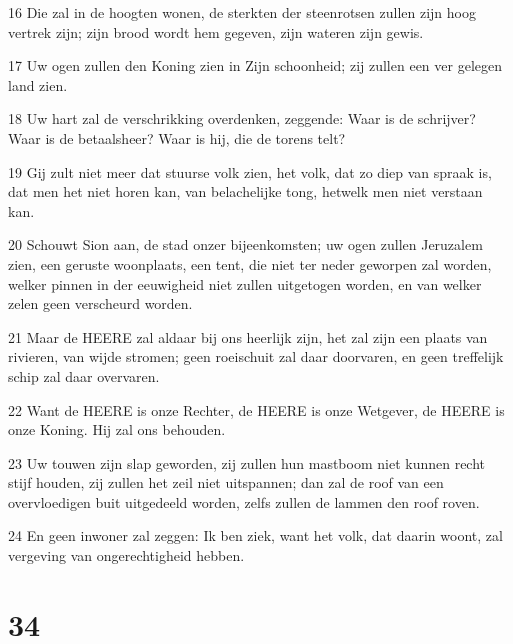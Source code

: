 \par 16 Die zal in de hoogten wonen, de sterkten der steenrotsen zullen zijn hoog vertrek zijn; zijn brood wordt hem gegeven, zijn wateren zijn gewis.
\par 17 Uw ogen zullen den Koning zien in Zijn schoonheid; zij zullen een ver gelegen land zien.
\par 18 Uw hart zal de verschrikking overdenken, zeggende: Waar is de schrijver? Waar is de betaalsheer? Waar is hij, die de torens telt?
\par 19 Gij zult niet meer dat stuurse volk zien, het volk, dat zo diep van spraak is, dat men het niet horen kan, van belachelijke tong, hetwelk men niet verstaan kan.
\par 20 Schouwt Sion aan, de stad onzer bijeenkomsten; uw ogen zullen Jeruzalem zien, een geruste woonplaats, een tent, die niet ter neder geworpen zal worden, welker pinnen in der eeuwigheid niet zullen uitgetogen worden, en van welker zelen geen verscheurd worden.
\par 21 Maar de HEERE zal aldaar bij ons heerlijk zijn, het zal zijn een plaats van rivieren, van wijde stromen; geen roeischuit zal daar doorvaren, en geen treffelijk schip zal daar overvaren.
\par 22 Want de HEERE is onze Rechter, de HEERE is onze Wetgever, de HEERE is onze Koning. Hij zal ons behouden.
\par 23 Uw touwen zijn slap geworden, zij zullen hun mastboom niet kunnen recht stijf houden, zij zullen het zeil niet uitspannen; dan zal de roof van een overvloedigen buit uitgedeeld worden, zelfs zullen de lammen den roof roven.
\par 24 En geen inwoner zal zeggen: Ik ben ziek, want het volk, dat daarin woont, zal vergeving van ongerechtigheid hebben.

\chapter{34}

